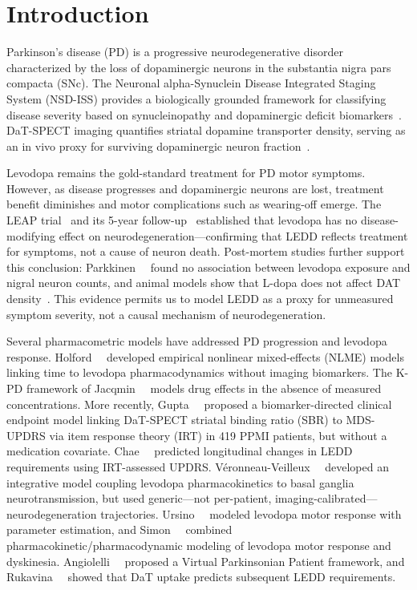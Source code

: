 \clearpage

\section{Introduction}

Parkinson's disease (PD) is a progressive neurodegenerative disorder
characterized by the loss of dopaminergic neurons in the substantia nigra
pars compacta (SNc). The Neuronal alpha-Synuclein Disease Integrated
Staging System (NSD-ISS) provides a biologically grounded framework for
classifying disease severity based on synucleinopathy and dopaminergic
deficit biomarkers~\cite{simuni2024}. DaT-SPECT imaging quantifies
striatal dopamine transporter density, serving as an in vivo proxy for
surviving dopaminergic neuron fraction~\cite{siderowf2020}.

Levodopa remains the gold-standard treatment for PD motor symptoms.
However, as disease progresses and dopaminergic neurons are lost, treatment
benefit diminishes and motor complications such as wearing-off emerge.
The LEAP trial~\cite{verschuur2019} and its 5-year
follow-up~\cite{frequin2024} established that levodopa has no
disease-modifying effect on neurodegeneration---confirming that LEDD
reflects treatment for symptoms, not a cause of neuron death. Post-mortem
studies further support this conclusion: Parkkinen~\etal~\cite{parkkinen2011}
found no association between levodopa exposure and nigral neuron counts,
and animal models show that L-dopa does not affect DAT
density~\cite{fernagut2010}. This evidence permits us to model LEDD as a
proxy for unmeasured symptom severity, not a causal mechanism of
neurodegeneration.

Several pharmacometric models have addressed PD progression and levodopa
response. Holford~\etal~\cite{holford2006} developed empirical nonlinear
mixed-effects (NLME) models linking time to levodopa pharmacodynamics
without imaging biomarkers. The K-PD framework of
Jacqmin~\etal~\cite{jacqmin2007} models drug effects in the absence of
measured concentrations. More recently, Gupta~\etal~\cite{gupta2025}
proposed a biomarker-directed clinical endpoint model linking DaT-SPECT
striatal binding ratio (SBR) to MDS-UPDRS via item response theory (IRT)
in 419 PPMI patients, but without a medication covariate.
Chae~\etal~\cite{chae2021} predicted longitudinal changes in LEDD
requirements using IRT-assessed UPDRS. V\'{e}ronneau-Veilleux~\etal~\cite{veronneau2020}
developed an integrative model coupling levodopa pharmacokinetics to
basal ganglia neurotransmission, but used generic---not per-patient,
imaging-calibrated---neurodegeneration trajectories.
Ursino~\etal~\cite{ursino2020} modeled levodopa motor response with
parameter estimation, and Simon~\etal~\cite{simon2016} combined
pharmacokinetic/pharmacodynamic modeling of levodopa motor response and
dyskinesia. Angiolelli~\etal~\cite{angiolelli2024} proposed a Virtual
Parkinsonian Patient framework, and Rukavina~\etal~\cite{rukavina2025}
showed that DaT uptake predicts subsequent LEDD requirements.

